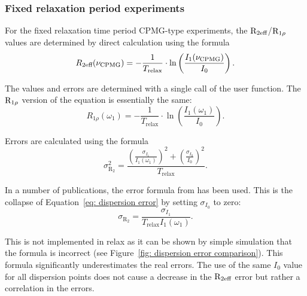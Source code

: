 \subsubsection{Fixed relaxation period experiments}

For the fixed relaxation time period CPMG-type experiments, the $\mathrm{R}_{2\textrm{eff}}$/$\mathrm{R}_{1\rho}$ values are determined by direct calculation using the formula
\begin{equation}
    R_{2\textrm{eff}}(\nu_\textrm{CPMG}) = - \frac{1}{T_\textrm{relax}} \cdot \ln \left( \frac{I_1(\nu_\textrm{CPMG})}{I_0} \right) .
\end{equation}

The values and errors are determined with a single call of the  user function.  The $\mathrm{R}_{1\rho}$ version of the equation is essentially the same:
\begin{equation}
    R_{1\rho}(\omega_1) = - \frac{1}{T_\textrm{relax}} \cdot \ln \left( \frac{I_1(\omega_1)}{I_0} \right) .
\end{equation}

Errors are calculated using the formula
\begin{equation} \label{eq: dispersion error}
    \sigma_{\textrm{R}_2}^2 = \frac{\left( \frac{\sigma_{I_1}}{I_1(\omega_1)} \right)^2  +  \left( \frac{\sigma_{I_0}}{I_0} \right)^2 }{T_\textrm{relax}} .
\end{equation}

In a number of publications, the error formula from \citet{IshimaTorchia05} has been used.  This is the collapse of Equation~\ref{eq: dispersion error} by setting $\sigma_{I_0}$ to zero:
\begin{equation} \label{eq: IT05 dispersion error}
    \sigma_{\textrm{R}_2} = \frac{\sigma_{I_1}}{T_\textrm{relax} I_1(\omega_1)} .
\end{equation}

This is not implemented in relax as it can be shown by simple simulation that the formula is incorrect (see Figure~\ref{fig: dispersion error comparison}).  This formula significantly underestimates the real errors.  The use of the same $I_0$ value for all dispersion points does not cause a decrease in the $\mathrm{R}_{2\textrm{eff}}$ error but rather a correlation in the errors.

